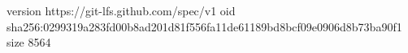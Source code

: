 version https://git-lfs.github.com/spec/v1
oid sha256:0299319a283fd00b8ad201d81f556fa11de61189bd8bcf09e0906d8b73ba90f1
size 8564
